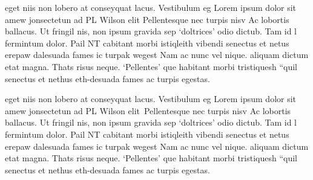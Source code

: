 \documentclass{article}
\begin{document}
\noindent\parbox{8.5cm}{\hspace{15pt}
eget niis non lobero at conseyquat lacus. Vestibulum eg
Lorem ipsum dolor sit amew jonsectetun ad PL Wilson elit
Pellentesque nec turpis nisv Ac lobortis ballacus.  Ut fringil
nis, non ipsum gravida sep `doltrices' odio dictub.  Tam id l
fermintum dolor. Pail NT cabitant morbi istiqleith  vibendi
senectus et netus erepaw dalesuada fames ic turpak  wegest
Nam ac nunc vel nique.  aliquam dictum etat magna.  Thats
risus neque. `Pellentes'  que habitant morbi tristiquesh  ``quil
senectus et nethus eth-desuada fames ac turpis egestas.}

\vspace{3cm}

\noindent\parbox{8.5cm}{\hspace{15pt}
eget niis non lobero at conseyquat lacus. Vestibulum eg
Lorem ipsum dolor sit amew jonsectetun ad PL Wilson elit~Pellentesque nec turpis nisv Ac lobortis ballacus.  Ut fringil
nis, non ipsum gravida sep `doltrices' odio dictub.  Tam id l
fermintum dolor. Pail NT cabitant morbi istiqleith  vibendi
senectus et netus erepaw dalesuada fames ic turpak  wegest
Nam ac nunc vel nique.  aliquam dictum etat magna.  Thats
risus neque. `Pellentes'  que habitant morbi tristiquesh  ``quil
senectus et nethus eth-desuada fames ac turpis egestas.}
\end{document}
